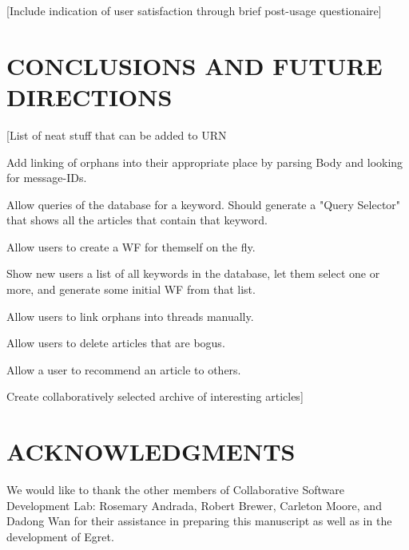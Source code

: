 [Include indication of user satisfaction through brief post-usage
questionaire]

\section{CONCLUSIONS AND FUTURE DIRECTIONS}
\label{sec:conclusion}


[List of neat stuff that can be added to URN

Add linking of orphans into their appropriate place by parsing Body and looking
for message-IDs.

Allow queries of the database for a keyword. Should generate a "Query Selector"
that shows all the articles that contain that keyword.

Allow users to create a WF for themself on the fly.

Show new users a list of all keywords in the database, let them select one
or more, and generate some initial WF from that list.

Allow users to link orphans into threads manually.

Allow users to delete articles that are bogus.

Allow a user to recommend an article to others.

Create collaboratively selected archive of interesting articles]

\section{ACKNOWLEDGMENTS}

We would like to thank the other members of Collaborative Software Development
Lab: Rosemary Andrada, Robert Brewer, Carleton Moore, and Dadong Wan for their
assistance in preparing this manuscript as well as in the development of
Egret\cite{csdl-92-01}.


%



